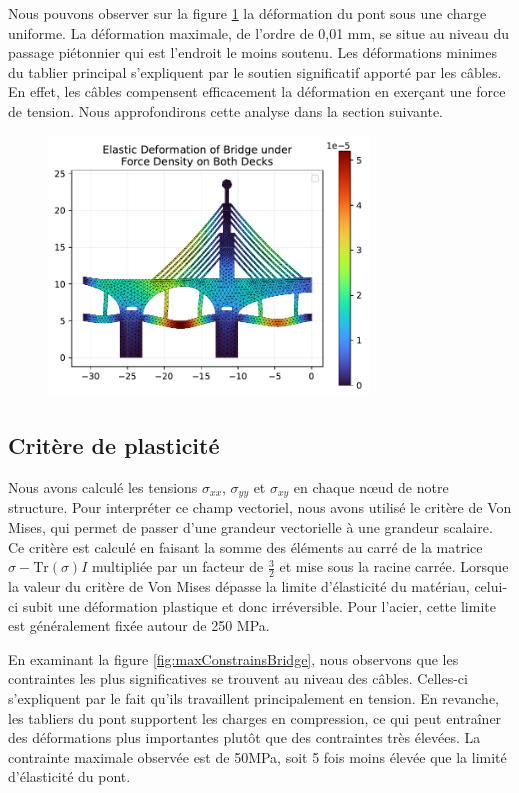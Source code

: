 \documentclass[conference]{IEEEtran}
\begin{document}
Nous pouvons observer sur la figure \ref{fig:elasticityBridge} la déformation du pont sous une charge uniforme. La déformation maximale, de l'ordre de 0,01 mm, se situe au niveau du passage piétonnier qui est l'endroit le moins soutenu. Les déformations minimes du tablier principal s'expliquent par le soutien significatif apporté par les câbles. En effet, les câbles compensent efficacement la déformation en exerçant une force de tension. Nous approfondirons cette analyse dans la section suivante.

\begin{figure}[!htb]
    \centering
    \includegraphics[width=8.5cm]{Figures/elasticityBridge.pdf}
    \label{fig:elasticityBridge}
\end{figure}

\subsection{Critère de plasticité}

Nous avons calculé les tensions $\sigma_{xx}$, $\sigma_{yy}$ et $\sigma_{xy}$ en chaque nœud de notre structure. Pour interpréter ce champ vectoriel, nous avons utilisé le critère de Von Mises, qui permet de passer d'une grandeur vectorielle à une grandeur scalaire. Ce critère est calculé en faisant la somme des éléments au carré de la matrice $\sigma - \mathrm{Tr} (\sigma)  I$ multipliée par un facteur de $\frac{3}{2}$ et mise sous la racine carrée. Lorsque la valeur du critère de Von Mises dépasse la limite d'élasticité du matériau, celui-ci subit une déformation plastique et donc irréversible. Pour l'acier, cette limite est généralement fixée autour de 250 MPa.

En examinant la figure \ref{fig:maxConstrainsBridge}, nous observons que les contraintes les plus significatives se trouvent au niveau des câbles. Celles-ci s'expliquent par le fait qu'ils travaillent principalement en tension. En revanche, les tabliers du pont supportent les charges en compression, ce qui peut entraîner des déformations plus importantes plutôt que des contraintes très élevées. La contrainte maximale observée est de 50MPa, soit 5 fois moins élevée que la limité d'élasticité du pont.
\end{document}
